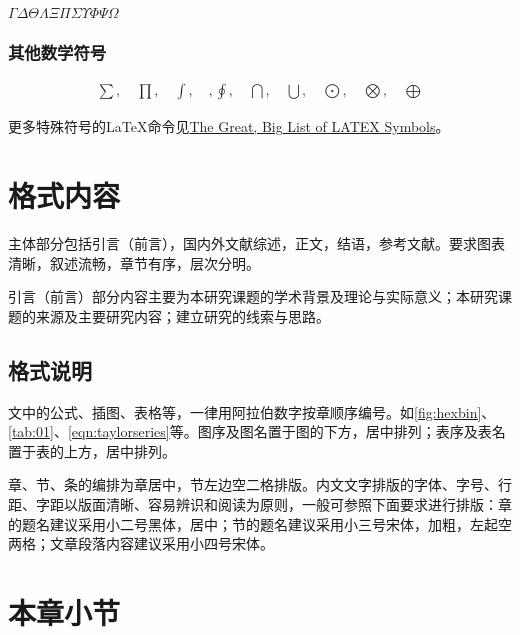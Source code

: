 $\Gamma\Delta\Theta\Lambda\Xi\Pi\Sigma\Upsilon\Phi\Psi\Omega$

\subsubsection{其他数学符号}
\begin{align*}
    \sum, \quad \prod, \quad \int, \quad, \oint, \quad \bigcap, \quad \bigcup, \quad \bigodot, \quad \bigotimes, \quad \bigoplus
\end{align*}

更多特殊符号的\LaTeX{}命令见\href{https://mirrors.ustc.edu.cn/CTAN/info/symbols/comprehensive/symbols-a4.pdf}{The Great, Big List of LATEX Symbols}。

    


\section{格式内容}

主体部分包括引言（前言），国内外文献综述，正文，结语，参考文献。要求图表清晰，叙述流畅，章节有序，层次分明。

引言（前言）部分内容主要为本研究课题的学术背景及理论与实际意义；本研究课题的来源及主要研究内容；建立研究的线索与思路。

\subsection{格式说明}

文中的公式、插图、表格等，一律用阿拉伯数字按章顺序编号。如\ref{fig:hexbin}、    \ref{tab:01}、\ref{eqn:taylorseries}等。图序及图名置于图的下方，居中排列；表序及表名置于表的上方，居中排列。

章、节、条的编排为章居中，节左边空二格排版。内文文字排版的字体、字号、行距、字距以版面清晰、容易辨识和阅读为原则，一般可参照下面要求进行排版：章的题名建议采用小二号黑体，居中；节的题名建议采用小三号宋体，加粗，左起空两格；文章段落内容建议采用小四号宋体。

\section{本章小节}
